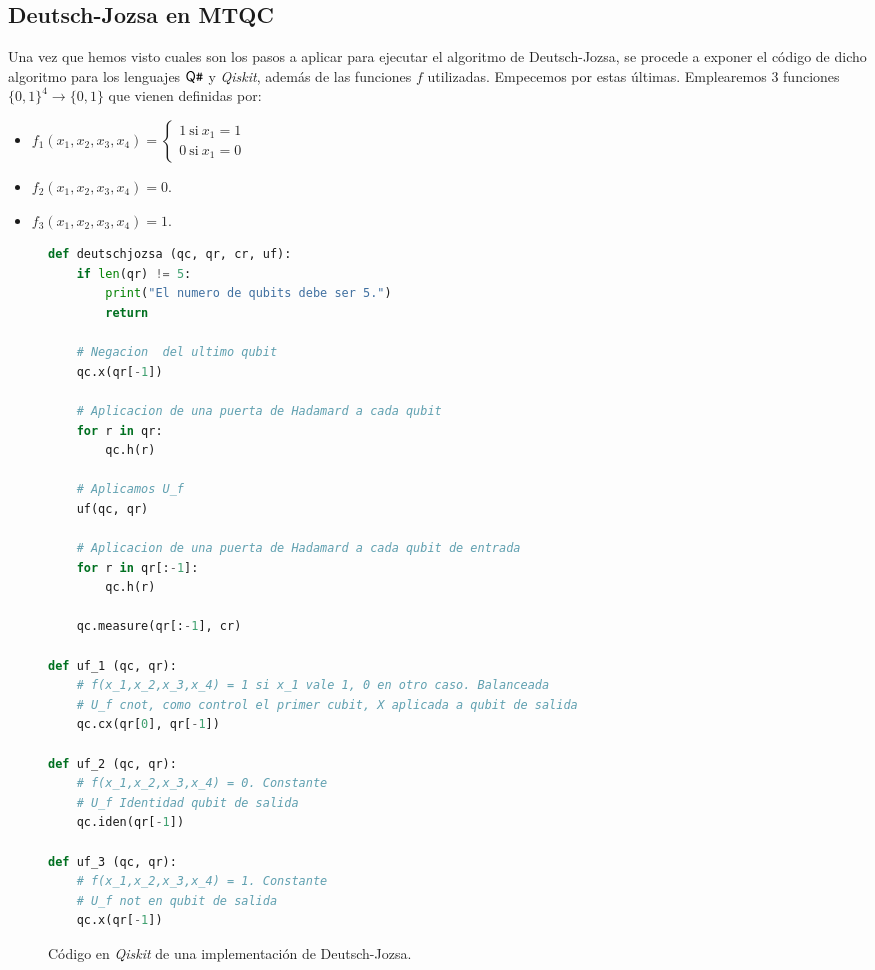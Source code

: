 \subsection{Deutsch-Jozsa en MTQC}

Una vez que hemos visto cuales son los pasos a aplicar para ejecutar el algoritmo de Deutsch-Jozsa, se procede a exponer el código de dicho algoritmo para los lenguajes $\textsf{Q}\texttt{\#}$ y \textit{Qiskit}, además de las funciones $f$ utilizadas. Empecemos por estas últimas.
%
Emplearemos 3 funciones $\{0,1\}^4\longrightarrow\{0,1\}$ que vienen definidas por:
\begin{itemize}
\item $f_1(x_1,x_2,x_3,x_4)=\left\{\begin{matrix}1 \mathrm{\ si\ } x_1=1\\0 \mathrm{\ si\ } x_1=0\end{matrix}\right.$

\item $f_2(x_1,x_2,x_3,x_4)=0$.

\item $f_3(x_1,x_2,x_3,x_4)=1$.
\end{itemize}

\begin{figure}[tb]
\begin{lstlisting}[language=Python]
def deutschjozsa (qc, qr, cr, uf):
    if len(qr) != 5:
        print("El numero de qubits debe ser 5.")
        return
    
    # Negacion  del ultimo qubit
    qc.x(qr[-1])
    
    # Aplicacion de una puerta de Hadamard a cada qubit
    for r in qr:
        qc.h(r)
        
    # Aplicamos U_f
    uf(qc, qr)
        
    # Aplicacion de una puerta de Hadamard a cada qubit de entrada
    for r in qr[:-1]:
        qc.h(r)
            
    qc.measure(qr[:-1], cr)

def uf_1 (qc, qr):
    # f(x_1,x_2,x_3,x_4) = 1 si x_1 vale 1, 0 en otro caso. Balanceada
    # U_f cnot, como control el primer cubit, X aplicada a qubit de salida
    qc.cx(qr[0], qr[-1])
    
def uf_2 (qc, qr):
    # f(x_1,x_2,x_3,x_4) = 0. Constante
    # U_f Identidad qubit de salida
    qc.iden(qr[-1])
    
def uf_3 (qc, qr):
    # f(x_1,x_2,x_3,x_4) = 1. Constante
    # U_f not en qubit de salida
    qc.x(qr[-1])
\end{lstlisting}
\caption{Código en \textit{Qiskit} de una implementación de Deutsch-Jozsa.}
\label{fig:code62}
\end{figure}

